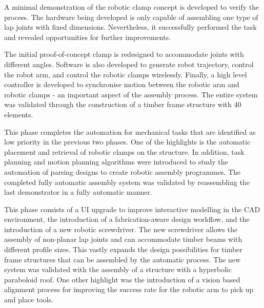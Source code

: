 \newcommand{\explorationbullet}{\raisebox{.10ex}{\large$\bullet$}}

\begin{description}[style=standard] %

    \item [Exploration Round 1 - Clamp Prototype] A minimal demonstration of the robotic clamp concept is developed to verify the process. The hardware being developed is only capable of assembling one type of lap joints with fixed dimensions. Nevertheless, it successfully performed the task and revealed opportunities for further improvements. 
    
    \item [Exploration Round 2 - Bus Stop Demonstrator] The initial proof-of-concept clamp is redesigned to accommodate joints with different angles. Software is also developed to generate robot trajectory, control the robot arm, and control the robotic clamps wirelessly. Finally, a high level controller is developed to synchronise motion between the robotic arm and robotic clamps - an important aspect of the assembly process. The entire system was validated through the construction of a timber frame structure with 40 elements. 
    
    \item [Exploration Round 3 - Automatic Clamp Placement] This phase completes the automation for mechanical tasks that are identified as low priority in the previous two phases. One of the highlights is the automatic placement and retrieval of robotic clamps on the structure. In addition, task planning and motion planning algorithms were introduced to study the automation of parsing designs to create robotic assembly programmes. The completed fully automatic assembly system was validated by reassembling the last demonstrator in a fully automatic manner. 
 
    \item [Exploration Round 4 - HyparHut Demonstrator] This phase consists of a UI upgrade to improve interactive modelling in the CAD environment, the introduction of a fabrication-aware design workflow, and the introduction of a new robotic screwdriver. The new screwdriver allows the assembly of non-planar lap joints and can accommodate timber beams with different profile sizes. This vastly expands the design possibilities for timber frame structures that can be assembled by the automatic process. The new system was validated with the assembly of a structure with a hyperbolic paraboloid roof. One other highlight was the introduction of a vision based alignment process for improving the success rate for the robotic arm to pick up and place tools. 
    

\end{description}
